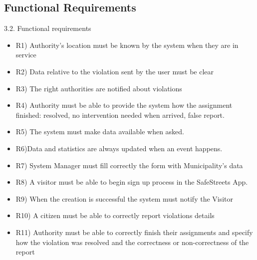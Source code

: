\subsection{Functional Requirements}
3.2. Functional requirements 
\begin{itemize}

 \item R1) Authority’s location must be known by the system when they are in service
\item  R2) Data relative to the violation sent by the user must be clear
 \item R3) The right authorities are notified about violations
 \item R4) Authority must be able to provide the system how the assignment finished: resolved, no intervention needed when arrived, false report.
 \item R5) The system must make data available when asked.
 \item R6)Data and statistics are always updated when an event happens.  
\item R7) System Manager must fill correctly the form with Municipality’s data
 \item R8) A visitor must be able to begin sign up process in the SafeStreets App.
 \item R9) When the creation is successful the system must notify the Visitor 
 \item R10) A citizen must be able to correctly report violations details
 \item R11) Authority must be able to correctly finish their assignments and specify how the violation was resolved and the correctness or non-correctness of the report
\end{itemize}
